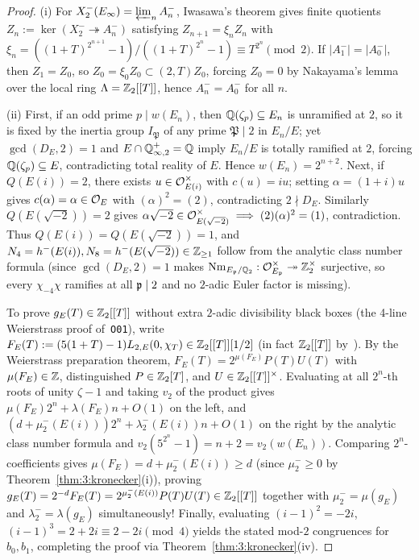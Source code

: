 \begin{proof}
(i) For $X_2^-(E_\infty) = \varprojlim_n A_n^-$, Iwasawa's theorem gives finite quotients $Z_n := \ker(X_2^- \twoheadrightarrow A_n^-)$ satisfying $Z_{n+1} = \xi_n Z_n$ with $\xi_n = ((1+T)^{2^{n+1}}-1)/((1+T)^{2^n}-1) \equiv T^{2^n} \pmod{2}$. If $|A_1^-| = |A_0^-|$, then $Z_1 = Z_0$, so $Z_0 = \xi_0 Z_0 \subset (2, T) Z_0$, forcing $Z_0 = 0$ by Nakayama's lemma over the local ring $\Lambda = \mathbb{Z}_2[[T]]$, hence $A_n^- = A_0^-$ for all $n$.

(ii) First, if an odd prime $p \mid w(E_n)$, then $\mathbb{Q}(\zeta_p) \subseteq E_n$ is unramified at $2$, so it is fixed by the inertia group $I_{\mathfrak{P}}$ of any prime $\mathfrak{P} \mid 2$ in $E_n/E$; yet $\gcd(D_E, 2)=1$ and $E \cap \mathbb{Q}_{\infty,2}^+ = \mathbb{Q}$ imply $E_n/E$ is totally ramified at $2$, forcing $\mathbb{Q}(\zeta_p) \subseteq E$, contradicting total reality of $E$. Hence $w(E_n) = 2^{n+2}$. Next, if $Q(E(i)) = 2$, there exists $u \in \mathcal{O}_{E(i)}^\times$ with $c(u) = i u$; setting $\alpha = (1+i)u$ gives $c(\alpha) = \alpha \in \mathcal{O}_E$ with $(\alpha)^2 = (2)$, contradicting $2 \nmid D_E$. Similarly $Q(E(\sqrt{-2})) = 2$ gives $\alpha\sqrt{-2} \in \mathcal{O}_{E(\sqrt{-2})}^\times \implies (2)(\alpha)^2 = (1)$, contradiction. Thus $Q(E(i)) = Q(E(\sqrt{-2})) = 1$, and $N_4 = h^-(E(i)), N_8 = h^-(E(\sqrt{-2})) \in \mathbb{Z}_{\ge 1}$ follow from the analytic class number formula (since $\gcd(D_E, 2) = 1$ makes $\operatorname{Nm}_{E_{\mathfrak{p}}/\mathbb{Q}_2} : \mathcal{O}_{E_{\mathfrak{p}}}^\times \twoheadrightarrow \mathbb{Z}_2^\times$ surjective, so every $\chi_{-4}\chi$ ramifies at all $\mathfrak{p} \mid 2$ and no $2$-adic Euler factor is missing).

To prove $g_E(T) \in \mathbb{Z}_2[[T]]$ without extra $2$-adic divisibility black boxes (the 4-line Weierstrass proof of~\texttt{O01}), write $F_E(T) := (5(1+T)-1)L_{2,E}(0,\chi_T) \in \mathbb{Z}_2[[T]][1/2]$ (in fact $\mathbb{Z}_2[[T]]$ by~\cite{DR1980}). By the Weierstrass preparation theorem, $F_E(T) = 2^{\mu(F_E)} P(T) U(T)$ with $\mu(F_E) \in \mathbb{Z}$, distinguished $P \in \mathbb{Z}_2[T]$, and $U \in \mathbb{Z}_2[[T]]^\times$. Evaluating at all $2^n$-th roots of unity $\zeta - 1$ and taking $v_2$ of the product gives $\mu(F_E) 2^n + \lambda(F_E) n + O(1)$ on the left, and $(d + \mu_2^-(E(i))) 2^n + \lambda_2^-(E(i)) n + O(1)$ on the right by the analytic class number formula and $v_2(5^{2^n}-1) = n+2 = v_2(w(E_n))$. Comparing $2^n$-coefficients gives $\mu(F_E) = d + \mu_2^-(E(i)) \ge d$ (since $\mu_2^- \ge 0$ by Theorem~\ref{thm:3:kronecker}(i)), proving $g_E(T) = 2^{-d} F_E(T) = 2^{\mu_2^-(E(i))} P(T) U(T) \in \mathbb{Z}_2[[T]]$ together with $\mu_2^- = \mu(g_E)$ and $\lambda_2^- = \lambda(g_E)$ simultaneously! Finally, evaluating $(i-1)^2 = -2i$, $(i-1)^3 = 2 + 2i \equiv 2 - 2i \pmod{4}$ yields the stated mod-$2$ congruences for $b_0, b_1$, completing the proof via Theorem~\ref{thm:3:kronecker}(iv).
\end{proof}

